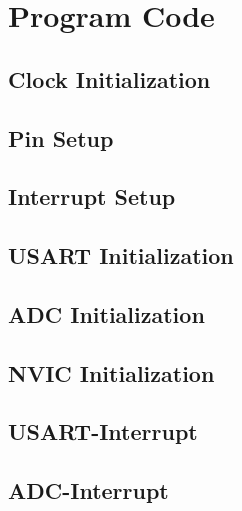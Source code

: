 
\section{Program Code}

\subsection{Clock Initialization}

\subsection{Pin Setup}

\subsection{Interrupt Setup}

\subsection{USART Initialization}

\subsection{ADC Initialization}

\subsection{NVIC Initialization}

\subsection{USART-Interrupt}

\subsection{ADC-Interrupt}
